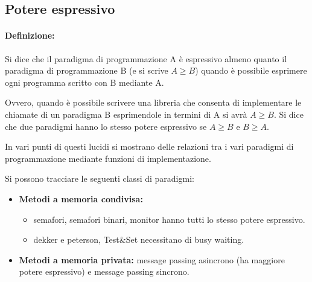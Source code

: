 \subsection{Potere espressivo}
\paragraph{Definizione:} Si dice che il paradigma di programmazione A è espressivo almeno quanto il paradigma di programmazione B (e si scrive $A \ge B$) quando è possibile esprimere ogni programma scritto con B mediante A.

Ovvero, quando è possibile scrivere una libreria che consenta di implementare le chiamate di un paradigma B esprimendole in termini di A si avrà $A \ge B$.
\newline
Si dice che due paradigmi hanno lo stesso potere espressivo se $A \ge B$ e $B \ge A$.

In vari punti di questi lucidi si mostrano delle relazioni tra i vari paradigmi di programmazione mediante funzioni di implementazione.

Si possono tracciare le seguenti classi di paradigmi:
\begin{itemize}
    \item \textbf{Metodi a memoria condivisa:}
    \begin{itemize}
        \item semafori, semafori binari, monitor hanno tutti lo stesso potere espressivo.
        \item dekker e peterson, Test\&Set necessitano di busy waiting.
    \end{itemize}
    
    \item \textbf{Metodi a memoria privata:} message passing asincrono (ha maggiore potere espressivo) e message passing sincrono.
\end{itemize}
